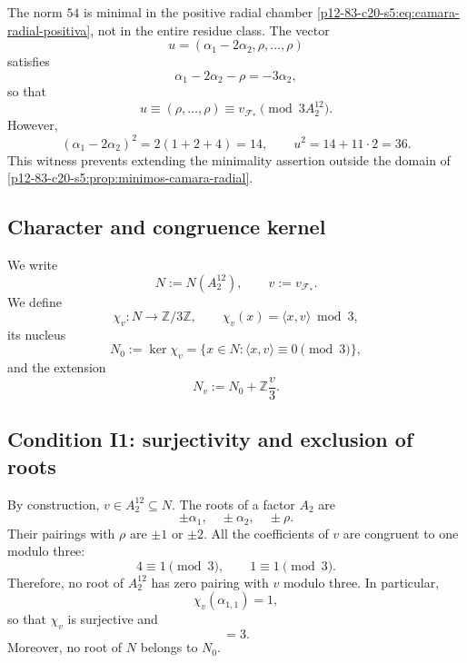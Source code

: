 \begin{remark}
The norm \(54\) is minimal in the positive radial chamber
\eqref{p12-83-c20-s5:eq:camara-radial-positiva}, not in the entire residue class. The vector
\[
 u=(\alpha_1-2\alpha_2,\rho,\ldots,\rho)
\]
satisfies
\[
 \alpha_1-2\alpha_2-\rho=-3\alpha_2,
\]
so that
\[
 u\equiv(\rho,\ldots,\rho)
 \equiv v_{\mathcal F_*}\pmod{3A_2^{12}}.
\]
However,
\[
 (\alpha_1-2\alpha_2)^2
 =2(1+2+4)=14,
 \qquad
 u^2=14+11\cdot2=36.
\]
This witness prevents extending the minimality assertion outside the domain
of \cref{p12-83-c20-s5:prop:minimos-camara-radial}.
\end{remark}

\subsection{Character and congruence kernel}

We write
\[
 N:=N(A_2^{12}),
 \qquad
 v:=v_{\mathcal F_*}.
\]
We define
\begin{equation}
 \chi_v:N\longrightarrow\mathbb Z/3\mathbb Z,
 \qquad
 \chi_v(x)=\langle x,v\rangle\bmod3,
 \label{p12-83-c20-s5:eq:caracter-vecino-leech}
\end{equation}
its nucleus
\begin{equation}
 N_0:=\ker\chi_v
 =\{x\in N:\langle x,v\rangle\equiv0\pmod3\},
 \label{p12-83-c20-s5:eq:nucleo-congruencia-vecino}
\end{equation}
and the extension
\begin{equation}
 N_v:=N_0+\mathbb Z\frac v3.
 \label{p12-83-c20-s5:eq:definicion-vecino-indice-tres}
\end{equation}

\subsection{Condition I1: surjectivity and exclusion of roots}

By construction, \(v\in A_2^{12}\subseteq N\). The roots of a factor
\(A_2\) are
\[
 \pm\alpha_1,
 \quad
 \pm\alpha_2,
 \quad
 \pm\rho.
\]
Their pairings with \(\rho\) are \(\pm1\) or \(\pm2\). All the
coefficients of \(v\) are congruent to one modulo three:
\[
 4\equiv1\pmod3,
 \qquad
 1\equiv1\pmod3.
\]
Therefore, no root of \(A_2^{12}\) has zero pairing with
\(v\) modulo three. In particular,
\[
 \chi_v(\alpha_{1,1})=1,
\]
so that \(\chi_v\) is surjective and
\begin{equation}
 [N:N_0]=3.
 \label{p12-83-c20-s5:eq:indice-nucleo-vecino}
\end{equation}
Moreover, no root of \(N\) belongs to \(N_0\).

